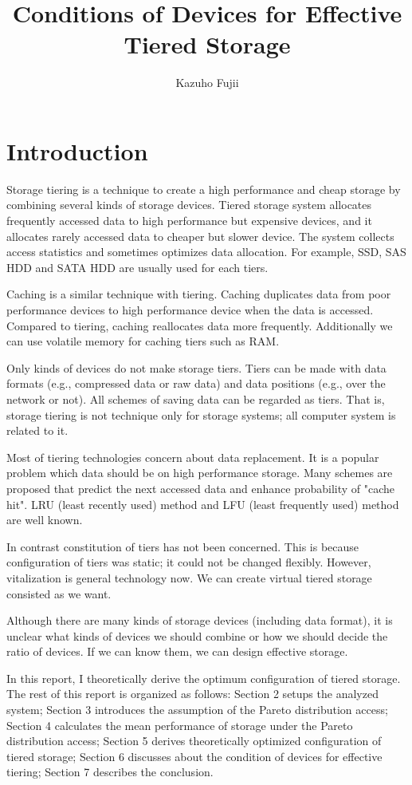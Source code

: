 \documentclass[a4paper,11pt]{article}
\title{Conditions of Devices for Effective Tiered Storage}
\author{Kazuho Fujii}
\date{}
\begin{document}
\maketitle

\section{Introduction}


Storage tiering is a technique to create a high performance and cheap
storage by combining several kinds of storage devices. Tiered storage
system allocates frequently accessed data to high performance but
expensive devices, and it allocates rarely accessed data to cheaper but
slower device. The system collects access statistics and sometimes
optimizes data allocation.
For example, SSD, SAS HDD and SATA HDD are usually used for each tiers.


Caching is a similar technique with tiering. Caching duplicates data from
poor performance devices to high performance device when the data is
accessed. Compared to tiering, caching reallocates data more frequently.
Additionally we can use volatile memory for caching tiers such as RAM.


Only kinds of devices do not make storage tiers. Tiers can be made with
data formats (e.g., compressed data or raw data) and data positions (e.g.,
over the network or not). All schemes of saving data can be regarded as
tiers. That is, storage tiering is not technique only for storage
systems; all computer system is related to it.


Most of tiering technologies concern about data replacement. It is a
popular problem which data should be on high performance storage. Many
schemes are proposed that predict the next accessed data and enhance
probability of "cache hit". LRU (least recently used) method and LFU (least frequently used) method are well known.


In contrast constitution of tiers has not been concerned. This is because
configuration of tiers was static; it could not be changed flexibly.
However, vitalization is general technology now. We can create virtual
tiered storage consisted as we want.


Although there are many kinds of storage devices (including data format),
it is unclear what kinds of devices we should combine or how we should
decide the ratio of devices. If we can know them, we can design effective
storage.


In this report, I theoretically derive the optimum configuration of tiered
storage. The rest of this report is organized as follows:
Section 2 setups the analyzed system;
Section 3 introduces the assumption of the Pareto distribution access;
Section 4 calculates the mean performance of storage under the Pareto distribution access;
Section 5 derives theoretically optimized configuration of tiered storage;
Section 6 discusses about the condition of devices for effective tiering;
Section 7 describes the conclusion.
\end{document}
